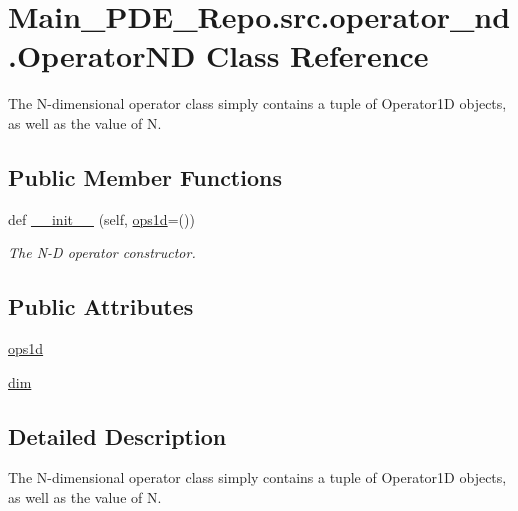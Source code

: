 \hypertarget{classMain__PDE__Repo_1_1src_1_1operator__nd_1_1OperatorND}{}\section{Main\+\_\+\+P\+D\+E\+\_\+\+Repo.\+src.\+operator\+\_\+nd.\+Operator\+ND Class Reference}
\label{classMain__PDE__Repo_1_1src_1_1operator__nd_1_1OperatorND}


The N-\/dimensional operator class simply contains a tuple of Operator1D objects, as well as the value of N.  


\subsection*{Public Member Functions}
\begin{DoxyCompactItemize}
\item 
def \hyperlink{classMain__PDE__Repo_1_1src_1_1operator__nd_1_1OperatorND_a3d6e107a1fc9f7111fc11cac4ab6744c}{\+\_\+\+\_\+init\+\_\+\+\_\+} (self, \hyperlink{classMain__PDE__Repo_1_1src_1_1operator__nd_1_1OperatorND_a2e8822f15abc5604dd0ba9c61528fb68}{ops1d}=())
\begin{DoxyCompactList}\small\item\em The N-\/D operator constructor. \end{DoxyCompactList}\end{DoxyCompactItemize}
\subsection*{Public Attributes}
\begin{DoxyCompactItemize}
\item 
\hyperlink{classMain__PDE__Repo_1_1src_1_1operator__nd_1_1OperatorND_a2e8822f15abc5604dd0ba9c61528fb68}{ops1d}
\item 
\hyperlink{classMain__PDE__Repo_1_1src_1_1operator__nd_1_1OperatorND_a46df4cd21842a04ac2daa3e1a7a70fd8}{dim}
\end{DoxyCompactItemize}


\subsection{Detailed Description}
The N-\/dimensional operator class simply contains a tuple of Operator1D objects, as well as the value of N. 

